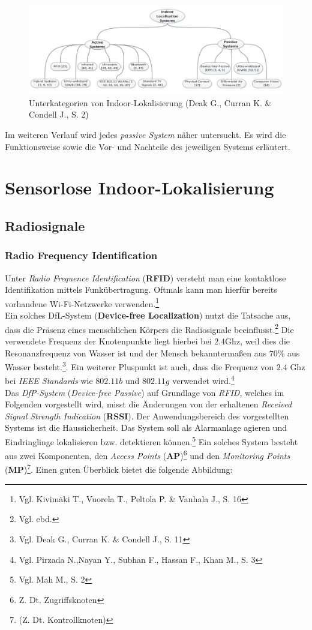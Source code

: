 \begin{figure}[H]
	\centering
	\includegraphics[scale=0.9]{pictures/indoor_loc}
	\caption{Unterkategorien von Indoor-Lokalisierung (Deak G.,  Curran K. \& Condell J., S. 2)}
\end{figure}

Im weiteren Verlauf wird jedes \textit{passive System} näher untersucht. Es wird die Funktionsweise sowie die Vor- und Nachteile des jeweiligen Systems erläutert.


\section{Sensorlose Indoor-Lokalisierung}
\subsection{Radiosignale}
\subsubsection{Radio Frequency Identification}
Unter \textit{Radio Frequence Identification} (\textbf{RFID}) versteht man eine kontaktlose Identifikation mittels Funkübertragung. Oftmals kann man hierfür bereits vorhandene Wi-Fi-Netzwerke verwenden.\footnote{Vgl. Kivimäki T., Vuorela T., Peltola P. \& Vanhala J., S.  16} \\
Ein solches DfL-System (\textbf{Device-free Localization}) nutzt die Tatsache aus, dass die Präsenz eines menschlichen Körpers die Radiosignale beeinflusst.\footnote{Vgl. ebd.} Die verwendete Frequenz der Knotenpunkte liegt hierbei bei $2.4$Ghz, weil dies die Resonanzfrequenz von Wasser ist und der Mensch bekanntermaßen aus $70\%$ aus Wasser besteht.\footnote{Vgl. Deak G.,  Curran K. \& Condell J., S. 11}. Ein weiterer Pluspunkt ist auch, dass die Frequenz von $2.4$ Ghz bei \textit{IEEE Standards} wie $802.11b$ und $802.11g$ verwendet wird.\footnote{Vgl. Pirzada N.,Nayan Y., Subhan F., Hassan F., Khan M., S. 3}\\
Das \textit{DfP-System} (\textit{Device-free Passive}) auf Grundlage von \textit{RFID}, welches im Folgenden vorgestellt wird, misst die Änderungen von der erhaltenen \textit{Received Signal Strength Indication} (\textbf{RSSI}). Der Anwendungsbereich des vorgestellten Systems ist die Haussicherheit. Das System soll als Alarmanlage agieren und Eindringlinge lokalisieren bzw. detektieren können.\footnote{Vgl. Mah M., S. 2} Ein solches System besteht aus zwei Komponenten, den \textit{Access Points} (\textbf{AP})\footnote{Z. Dt. Zugriffsknoten} und den \textit{Monitoring Points} (\textbf{MP})\footnote{(Z. Dt. Kontrollknoten)}. Einen guten Überblick bietet die folgende Abbildung:\\

